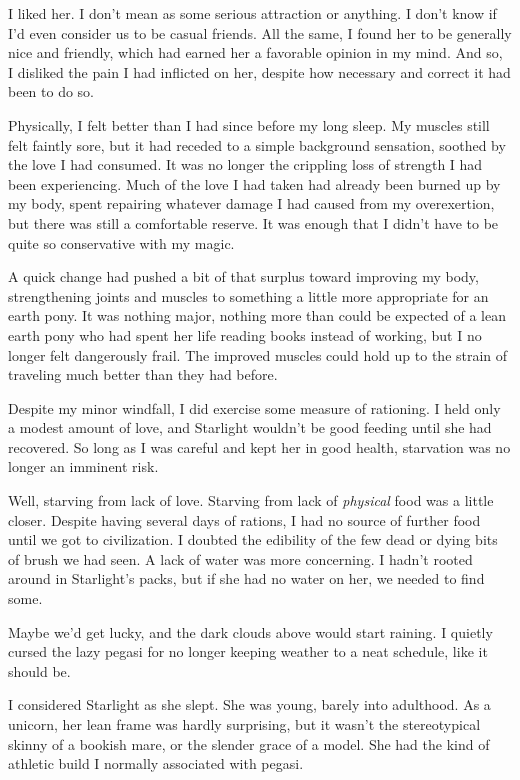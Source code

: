 I liked her. I don’t mean as some serious attraction or anything. I don’t know if I’d even consider us to be casual friends. All the same, I found her to be generally nice and friendly, which had earned her a favorable opinion in my mind. And so, I disliked the pain I had inflicted on her, despite how necessary and correct it had been to do so.

Physically, I felt better than I had since before my long sleep. My muscles still felt faintly sore, but it had receded to a simple background sensation, soothed by the love I had consumed. It was no longer the crippling loss of strength I had been experiencing. Much of the love I had taken had already been burned up by my body, spent repairing whatever damage I had caused from my overexertion, but there was still a comfortable reserve. It was enough that I didn’t have to be quite so conservative with my magic.

A quick change had pushed a bit of that surplus toward improving my body, strengthening joints and muscles to something a little more appropriate for an earth pony. It was nothing major, nothing more than could be expected of a lean earth pony who had spent her life reading books instead of working, but I no longer felt dangerously frail. The improved muscles could hold up to the strain of traveling much better than they had before.

Despite my minor windfall, I did exercise some measure of rationing. I held only a modest amount of love, and Starlight wouldn’t be good feeding until she had recovered. So long as I was careful and kept her in good health, starvation was no longer an imminent risk.

Well, starving from lack of love. Starving from lack of \textit{physical} food was a little closer. Despite having several days of rations, I had no source of further food until we got to civilization. I doubted the edibility of the few dead or dying bits of brush we had seen. A lack of water was more concerning. I hadn’t rooted around in Starlight’s packs, but if she had no water on her, we needed to find some.

Maybe we’d get lucky, and the dark clouds above would start raining. I quietly cursed the lazy pegasi for no longer keeping weather to a neat schedule, like it should be.

I considered Starlight as she slept. She was young, barely into adulthood. As a unicorn, her lean frame was hardly surprising, but it wasn’t the stereotypical skinny of a bookish mare, or the slender grace of a model. She had the kind of athletic build I normally associated with pegasi.

